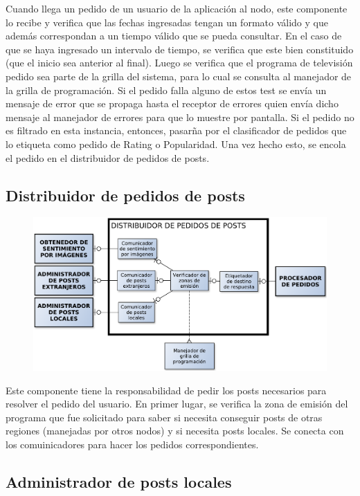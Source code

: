 Cuando llega un pedido de un usuario de la aplicación al nodo, este componente lo recibe y verifica que las fechas ingresadas tengan un formato válido y que 
además correspondan a un tiempo válido que se pueda consultar. En el caso de que se haya ingresado un intervalo de tiempo, se verifica que este bien constituido (que el inicio sea anterior al final). Luego se verifica que el programa de televisión pedido sea parte de la grilla del sistema, para lo cual se consulta al manejador de la grilla de programación. Si el pedido falla alguno de estos test se envía un mensaje de error que se propaga hasta el receptor de errores quien envía dicho mensaje al manejador de errores para que lo muestre por pantalla. Si el pedido no es filtrado en esta instancia, entonces, pasarña por el clasificador de pedidos que lo etiqueta como pedido de Rating o Popularidad. Una vez hecho esto, se encola el pedido en el distribuidor de pedidos de posts.

\subsection{Distribuidor de pedidos de posts}

\begin{figure}[H]
\centering
\includegraphics[width=\textwidth]{graph/distribuidor.pdf}
\end{figure}

Este componente tiene la responsabilidad de pedir los posts necesarios para resolver el pedido del usuario. En primer lugar, se verifica la zona de emisión del programa que fue solicitado para saber si necesita conseguir posts de otras regiones (manejadas por otros nodos) y si necesita posts locales. Se conecta con los comuinicadores para hacer los pedidos correspondientes.

\subsection{Administrador de posts locales}


